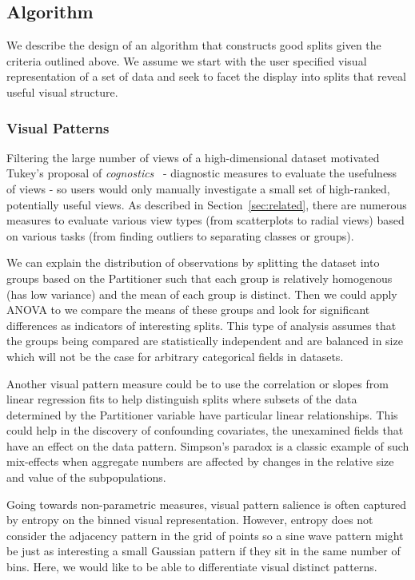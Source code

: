 \subsection{Algorithm}
We describe the design of an algorithm that constructs good splits given the criteria outlined above. We assume we start with the user specified visual representation of a set of data and seek to facet the display into splits that reveal useful visual structure.

\subsubsection{Visual Patterns}
Filtering the large number of views of a high-dimensional dataset motivated Tukey's proposal of \textit{cognostics}~\cite{Tukey1982,Tukey1985} - diagnostic measures to evaluate the usefulness of views - so users would only manually investigate a small set of high-ranked, potentially useful views. As described in Section~\ref{sec:related}, there are numerous measures to evaluate various view types (from scatterplots to radial views) based on various tasks (from finding outliers to separating classes or groups).

We can explain the distribution of observations by splitting the dataset into groups based on the Partitioner such that each group is relatively homogenous (has low variance) and the mean of each group is distinct. Then we could apply ANOVA to we compare the means of these groups and look for significant differences as indicators of interesting splits. This type of analysis assumes that the groups being compared are statistically independent and are balanced in size which will not be the case for arbitrary categorical fields in datasets. 

Another visual pattern measure could be to use the correlation or slopes from linear regression fits to help distinguish splits where subsets of the data determined by the Partitioner variable have particular linear relationships. This could help in the discovery of confounding covariates, the unexamined fields that have an effect on the data pattern. Simpson's paradox is a classic example of such mix-effects when aggregate numbers are affected by changes in the relative size and value of the subpopulations. 

Going towards non-parametric measures, visual pattern salience is often captured by entropy on the binned visual representation. However, entropy does not consider the adjacency pattern in the grid of points so a sine wave pattern might be just as interesting a small Gaussian pattern if they sit in the same number of bins. Here, we would like to be able to differentiate visual distinct patterns.

